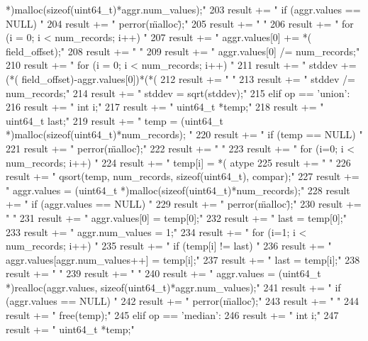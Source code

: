 \begin{DoxyCode}
{       *)malloc(sizeof(uint64_t)*aggr.num_values);\n"
203         result += "    if (aggr.values == NULL) {\n"
204         result += "        perror(\"malloc\");\n"
205         result += "    }\n"
206         result += "    for (i = 0; i < num_records; i++) {\n"
207         result += "        aggr.values[0] += *(%
       field_offset);\n"%
208         result += "    }\n"
209         result += "    aggr.values[0] /= num_records;\n"
210         result += "    for (i = 0; i < num_records; i++) {\n"
211         result += "        stddev += (*(%
       field_offset)-aggr.values[0])*(*(%
212         result += "    }\n"
213         result += "    stddev /= num_records;\n"
214         result += "    stddev = sqrt(stddev);\n"
215     elif op == 'union':
216         result += "    int i;\n"
217         result += "    uint64_t *temp;\n"
218         result += "    uint64_t last;\n"
219         result += "    temp = (uint64_t *)malloc(sizeof(uint64_t)*num_records);
      \n"
220         result += "    if (temp == NULL) {\n"
221         result += "        perror(\"malloc\");\n"
222         result += "    }\n"
223         result += "    for (i=0; i < num_records; i++) {\n"
224         result += "        temp[i] = *(%
      atype
225         result += "    }\n"
226         result += "    qsort(temp, num_records, sizeof(uint64_t), compar);\n"
227         result += "    aggr.values = (uint64_t
       *)malloc(sizeof(uint64_t)*num_records);\n"
228         result += "    if (aggr.values == NULL) {\n"
229         result += "        perror(\"malloc\");\n"
230         result += "    }\n"
231         result += "    aggr.values[0] = temp[0];\n"
232         result += "    last = temp[0];\n"
233         result += "    aggr.num_values = 1;\n"
234         result += "    for (i=1; i < num_records; i++) {\n"
235         result += "        if (temp[i] != last) {\n"
236         result += "            aggr.values[aggr.num_values++] = temp[i];\n"
237         result += "            last = temp[i];\n"
238         result += "        }\n"
239         result += "    }\n"
240         result += "    aggr.values = (uint64_t *)realloc(aggr.values,
       sizeof(uint64_t)*aggr.num_values);\n"
241         result += "    if (aggr.values == NULL) {\n"
242         result += "        perror(\"malloc\");\n"
243         result += "    }\n"
244         result += "    free(temp);\n"
245     elif op == 'median':
246         result += "    int i;\n"
247         result += "    uint64_t *temp;\n"
}
\end{DoxyCode}
